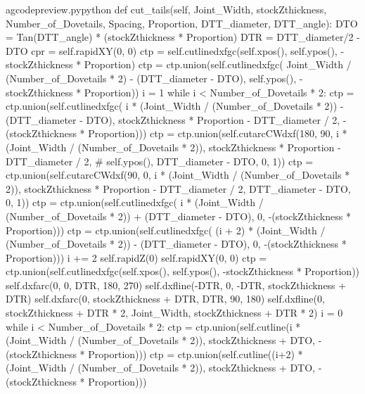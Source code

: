 \documentclass{ltxdoc}
\begin{document}
\lstset{firstnumber=\thegcpy}
\begin{writecode}{a}{gcodepreview.py}{python}
    def cut_tails(self, Joint_Width, stockZthickness, Number_of_Dovetails, Spacing, Proportion, DTT_diameter, DTT_angle):
        DTO = Tan(DTT_angle) * (stockZthickness * Proportion)
        DTR = DTT_diameter/2 - DTO
        cpr = self.rapidXY(0, 0)
        ctp = self.cutlinedxfgc(self.xpos(), self.ypos(), -stockZthickness * Proportion)
        ctp = ctp.union(self.cutlinedxfgc(
            Joint_Width / (Number_of_Dovetails * 2) - (DTT_diameter - DTO), 
            self.ypos(), 
            -stockZthickness * Proportion))
        i = 1
        while i < Number_of_Dovetails * 2:
            ctp = ctp.union(self.cutlinedxfgc(
                i * (Joint_Width / (Number_of_Dovetails * 2)) - (DTT_diameter - DTO), 
                stockZthickness * Proportion - DTT_diameter / 2,
                -(stockZthickness * Proportion)))
            ctp = ctp.union(self.cutarcCWdxf(180, 90, 
                i * (Joint_Width / (Number_of_Dovetails * 2)), 
                stockZthickness * Proportion - DTT_diameter / 2,
#                self.ypos(), 
                DTT_diameter - DTO,  0, 1))
            ctp = ctp.union(self.cutarcCWdxf(90, 0, 
                i * (Joint_Width / (Number_of_Dovetails * 2)), 
                stockZthickness * Proportion - DTT_diameter / 2, 
                DTT_diameter - DTO,  0, 1))
            ctp = ctp.union(self.cutlinedxfgc(
                i * (Joint_Width / (Number_of_Dovetails * 2)) + (DTT_diameter - DTO), 
                0, 
                -(stockZthickness * Proportion)))
            ctp = ctp.union(self.cutlinedxfgc(
                (i + 2) * (Joint_Width / (Number_of_Dovetails * 2)) - (DTT_diameter - DTO), 
                0, 
                -(stockZthickness * Proportion)))
            i += 2
        self.rapidZ(0)
        self.rapidXY(0, 0)
        ctp = ctp.union(self.cutlinedxfgc(self.xpos(), self.ypos(), -stockZthickness * Proportion))
        self.dxfarc(0, 0, DTR, 180, 270)
        self.dxfline(-DTR, 0, -DTR, stockZthickness + DTR)
        self.dxfarc(0, stockZthickness + DTR, DTR, 90, 180)
        self.dxfline(0, stockZthickness + DTR * 2, Joint_Width, stockZthickness + DTR * 2)
        i = 0
        while i < Number_of_Dovetails * 2:
            ctp = ctp.union(self.cutline(i * (Joint_Width / (Number_of_Dovetails * 2)), stockZthickness + DTO, -(stockZthickness * Proportion)))
            ctp = ctp.union(self.cutline((i+2) * (Joint_Width / (Number_of_Dovetails * 2)), stockZthickness + DTO, -(stockZthickness * Proportion)))

\end{writecode}
\end{document}
